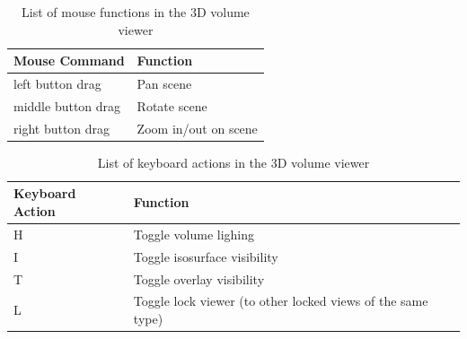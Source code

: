 \documentclass[fleqn,11pt,openany]{book}
\begin{document}
\begin{table}[h!]
\label{tab:3dmouse}
\caption{List of mouse functions in the 3D volume viewer}
\begin{tabular}{|l|l|}
\hline
{\bf Mouse Command} & {\bf Function}\\
\hline
left button drag & Pan scene\\
\hline
middle button drag & Rotate scene\\
\hline
right button drag & Zoom in/out on scene\\
\hline
\end{tabular}
\end{table}

\begin{table}[h!]
\label{tab:2dkey}
\caption{List of keyboard actions in the 3D volume viewer}
\begin{tabular}{|l|l|}
\hline
{\bf Keyboard Action} & {\bf Function}\\
\hline
H & Toggle volume lighing\\
\hline
I & Toggle isosurface visibility\\
\hline
T & Toggle overlay visibility\\
\hline
L & Toggle lock viewer (to other locked views of the same type)\\
\hline
\end{tabular}
\end{table}
\end{document}
